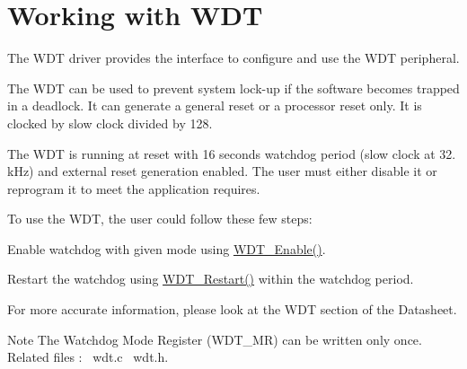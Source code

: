 \hypertarget{group__wdt__module}{}\section{Working with W\+DT}
\label{group__wdt__module}
The W\+DT driver provides the interface to configure and use the W\+DT peripheral.

The W\+DT can be used to prevent system lock-\/up if the software becomes trapped in a deadlock. It can generate a general reset or a processor reset only. It is clocked by slow clock divided by 128.

The W\+DT is running at reset with 16 seconds watchdog period (slow clock at 32. k\+Hz) and external reset generation enabled. The user must either disable it or reprogram it to meet the application requires.

To use the W\+DT, the user could follow these few steps\+: 
\begin{DoxyItemize}
\item Enable watchdog with given mode using \mbox{\hyperlink{wdt_8c_ac9145d17b1cbe9ca58154d330b22d9bf}{W\+D\+T\+\_\+\+Enable()}}. 
\item Restart the watchdog using \mbox{\hyperlink{wdt_8c_a3cd0aea566c94375faa90bc33f530011}{W\+D\+T\+\_\+\+Restart()}} within the watchdog period. 
\end{DoxyItemize}

For more accurate information, please look at the W\+DT section of the Datasheet.

\begin{DoxyNote}{Note}
The Watchdog Mode Register (W\+D\+T\+\_\+\+MR) can be written only once.~\newline
 Related files \+:~\newline
wdt.\+c~\newline
 wdt.\+h.~\newline
 
\end{DoxyNote}
